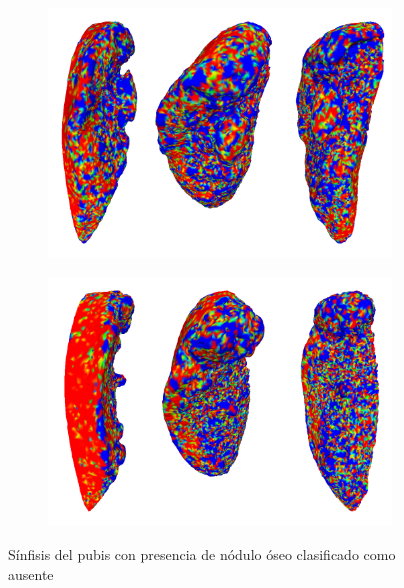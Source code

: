 \begin{figure}[p]
    \centering
    \begin{subfigure}{\textwidth}  
    \includegraphics[width=\textwidth]{imagenes/experiments/bone110_heat.png}
    \end{subfigure}
    \centering
    \begin{subfigure}{\textwidth}
    \includegraphics[width=\textwidth]{imagenes/experiments/bone346_heat.png}
    \end{subfigure}
    \caption[Nódulo óseo presente mal clasificado, mapas de activación]{Sínfisis del pubis con presencia de nódulo óseo clasificado como ausente}
    \label{fig:heatmap_present_false}
\end{figure}

